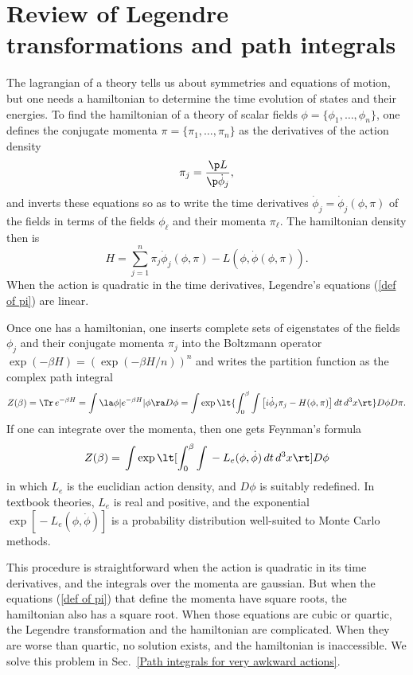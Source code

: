 \documentclass[prd,preprint,floatfix,showpacs]{revtex4-1}
\begin{document}
\section {Review of Legendre transformations and path integrals
\label {Review of Legendre transformations and path integrals} }

The lagrangian of a theory tells us about symmetries
and equations of motion, but one needs
a hamiltonian to determine 
the time evolution of states and their energies. 
To find the hamiltonian of a theory
of scalar fields 
\( \phi = \{\phi_1,\dots, \phi_n\} \),
one defines the conjugate momenta 
\( \pi = \{\pi_1,\dots, \pi_n\} \) as
the derivatives of the action density
\begin{equation}
\pi_j = \frac{\p  L }{\p \dot \phi_j} ,
\label {def of pi}
\end{equation}
and inverts these equations so as to
write the time derivatives 
\( \dot \phi_j = \dot \phi_j (\phi, \pi) \)
of the fields in terms of 
the fields \( \phi_\ell \) 
and their momenta \( \pi_\ell \)\@.
The hamiltonian density then is
\begin{equation}
H = \sum_{j=1}^n \pi_j \dot \phi_j(\phi,\pi) 
- L (\phi,\dot \phi(\phi,\pi) ) .
\label {energy density}
\end{equation}
When the action is quadratic 
in the time derivatives,
Legendre's equations (\ref {def of pi})
are linear.  
\par
Once one has a hamiltonian,
one inserts complete sets
of eigenstates of the fields \( \phi_j \) and 
their conjugate momenta \( \pi_j \)
into the Boltzmann operator 
\( \exp( - \beta H ) = ( \exp( - \beta H/n ) )^n \)
and writes the partition function as
the complex path integral~\cite{Weinberg1995IX}
\begin{equation}
Z(\beta) ={} \Tr \, e^{-\beta H}
= \int \la \phi | e^{- \beta H} | \phi \ra D\phi = 
\int \exp \lt\{ \int_0^\beta \int \left[ i \dot \phi_j \pi_j 
- H(\phi, \pi) \right] dt \, d^3x \rt\} D\phi D\pi .
\label {leads to the partition function}
\end{equation}
If one can integrate over the momenta,
then one gets Feynman's formula~\cite{Weinberg1995IX, CahillXVI}
\begin{equation}
Z(\beta) ={} \int \exp 
\lt[ \int_0^\beta \int 
{} - L_e(\phi, \dot \phi) \, dt \, d^3x \rt] D\phi 
\label {one gets the classic formula}
\end{equation}
in which \( L_e \) is the euclidian
action density, and \( D\phi \) is suitably
redefined.
In textbook theories, \( L_e \) 
is real and positive, and
the exponential \( \exp[{} - L_e(\phi,\dot \phi) ] \)
is a probability distribution
well-suited to Monte Carlo methods.
\par
This procedure is straightforward when 
the action is quadratic
in its time derivatives, 
and the integrals over the momenta are gaussian.
But when the equations
(\ref {def of pi}) that define
the momenta have square roots,
the hamiltonian also has a square root.
When those equations are cubic
or quartic, the Legendre transformation
and the hamiltonian are complicated.
When they are worse than
quartic, no solution exists, and the 
hamiltonian is inaccessible. 
We solve this problem in 
Sec.~\ref{Path integrals for very awkward actions}\@.
\end{document}
